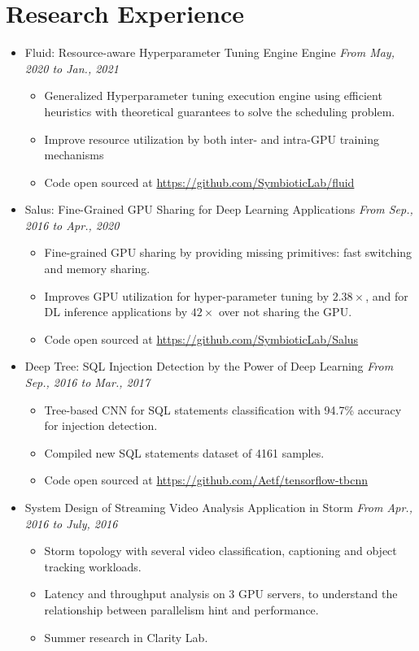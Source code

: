 \documentclass[letterpaper,11pt]{article}
\begin{document}
\section{Research Experience}
\begin{itemize}
    \item Fluid: Resource-aware Hyperparameter Tuning Engine
    Engine \hfill \textit{From May, 2020 to Jan., 2021}
    \begin{itemize}
        \item Generalized Hyperparameter tuning execution engine using efficient
        heuristics with theoretical guarantees to solve the scheduling problem.
        \item Improve resource utilization by both inter- and intra-GPU training
        mechanisms
        \item Code open sourced at \url{https://github.com/SymbioticLab/fluid}
    \end{itemize}
    \item Salus: Fine-Grained GPU Sharing for Deep Learning Applications \hfill \textit{From Sep., 2016 to Apr., 2020}
    \begin{itemize}
        \item Fine-grained GPU sharing by providing missing primitives: fast 
switching and memory sharing.
        \item Improves GPU utilization for hyper-parameter tuning by $2.38\times$, and for DL 
inference applications by $42\times$ over not sharing the GPU.
        \item Code open sourced at \url{https://github.com/SymbioticLab/Salus}
    \end{itemize}

    \item Deep Tree: SQL Injection Detection by the Power of Deep Learning \hfill \textit{From Sep., 2016 to Mar., 2017}
    \begin{itemize}
        \item Tree-based CNN for SQL statements classification with 94.7\% accuracy for injection 
detection.
        \item Compiled new SQL statements dataset of 4161 samples.
        \item Code open sourced at \url{https://github.com/Aetf/tensorflow-tbcnn}
    \end{itemize}

    \item System Design of Streaming Video Analysis Application in Storm \hfill \textit{From Apr., 2016 to July, 2016}
    \begin{itemize}
        \item Storm topology with several video classification, captioning and object tracking 
workloads.
        \item Latency and throughput analysis on 3 GPU servers, to understand the relationship 
between parallelism hint and performance.
        \item Summer research in Clarity Lab.
    \end{itemize}


\end{itemize}
\end{document}
